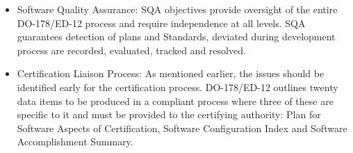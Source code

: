 {\begin{description}
\begin{itemize}
or configuration is the design of the DO-178/ED-12 objectives
for configuration management.
\item Software Quality Assurance: \ac{SQA} objectives provide oversight of the entire DO-178/ED-12
process and require independence at all levels. \ac{SQA} guarantees
detection of plans and Standards, deviated during development
process are recorded, evaluated, tracked and resolved.
\item Certification Liaison Process: As mentioned earlier, the
issues should be identified early for the certification process.
DO-178/ED-12 outlines twenty data items to be produced in a
compliant process where three of these are specific to it and
must be provided to the certifying authority: Plan for Software Aspects of Certification, Software Configuration Index and Software Accomplishment Summary.
\end{itemize}
\end{description}
}
